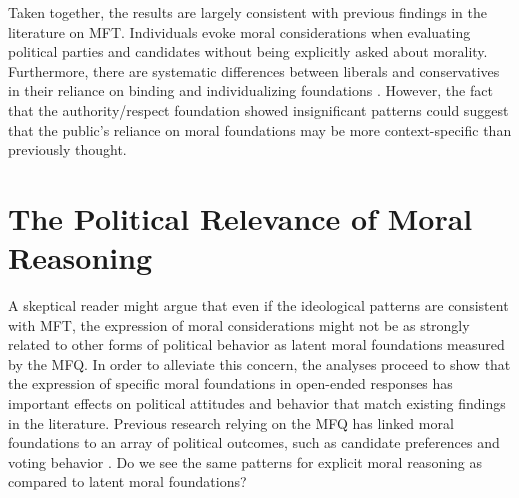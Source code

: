 \documentclass[12pt]{article}
\begin{document}
Taken together, the results are largely consistent with previous findings in the literature on MFT. Individuals evoke moral considerations when evaluating political parties and candidates without being explicitly asked about morality. Furthermore, there are systematic differences between liberals and conservatives in their reliance on binding and individualizing foundations \citep[see][for similar ideological differences when analyzing the content of life-narrative interviews]{mcadams2008family}. However, the fact that the authority/respect foundation showed insignificant patterns could suggest that the public's reliance on moral foundations may be more context-specific than previously thought.


\section*{The Political Relevance of Moral Reasoning}

A skeptical reader might argue that even if the ideological patterns are consistent with MFT, the expression of moral considerations might not be as strongly related to other forms of political behavior as latent moral foundations measured by the MFQ. In order to alleviate this concern, the analyses proceed to show that the expression of specific moral foundations in open-ended responses has important effects on political attitudes and behavior that match existing findings in the literature. Previous research relying on the MFQ has linked moral foundations to an array of political outcomes, such as candidate preferences \citep{iyer2010beyond} and voting behavior \citep{franks2015using}. Do we see the same patterns for explicit moral reasoning as compared to latent moral foundations?
\end{document}
